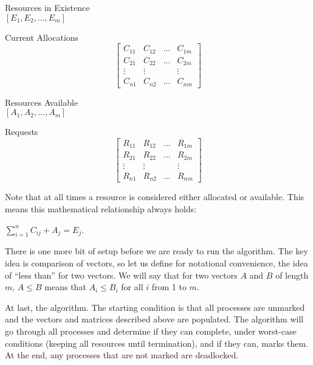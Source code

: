 \begin{multicols}{2}
	\begin{center}
		\textsf{Resources in Existence}\\
		$[E_{1}, E_{2}, ..., E_{m}]$

		\textsf{Current Allocations}
		\[
			\left[ {\begin{array}{cccc}
							C_{11} & C_{12} & ... & C_{1m} \\
							C_{21} & C_{22} & ... & C_{2m} \\
							\vdots & \vdots &     & \vdots \\
							C_{n1} & C_{n2} & ... & C_{nm}
						\end{array} } \right]
		\]
	\end{center}
	\columnbreak

	\begin{center}
		\textsf{Resources Available}\\
		$[A_{1}, A_{2}, ..., A_{m}]$

		\textsf{Requests}
		\[
			\left[ {\begin{array}{cccc}
							R_{11} & R_{12} & ... & R_{1m} \\
							R_{21} & R_{22} & ... & R_{2m} \\
							\vdots & \vdots &     & \vdots \\
							R_{n1} & R_{n2} & ... & R_{nm}
						\end{array} } \right]
		\]
	\end{center}

\end{multicols}

Note that at all times a resource is considered either allocated or available. This means this mathematical relationship always holds:
\vspace{-2em}
\begin{center}
	$\sum\limits_{i=1}^n C_{ij} + A_{j} = E_{j}$.
\end{center}

There is one more bit of setup before we are ready to run the algorithm. The key idea is comparison of vectors, so let us define for notational convenience, the idea of ``less than'' for two vectors. We will say that for two vectors $A$ and $B$ of length $m$,  $A \leq B$ means that $A_{i} \leq B_{i}$ for all $i$ from 1 to $m$.

At last, the algorithm. The starting condition is that all processes are unmarked and the vectors and matrices described above are populated. The algorithm will go through all processes and determine if they can complete, under worst-case conditions (keeping all resources until termination), and if they can, marks them. At the end, any processes that are not marked are deadlocked.

